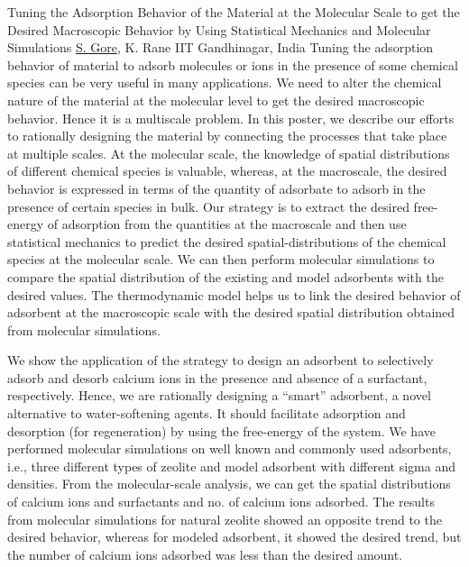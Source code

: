 
    \begin{abstract_online}{Tuning the Adsorption Behavior of the Material at the Molecular Scale to get the Desired Macroscopic Behavior by Using Statistical Mechanics and Molecular Simulations}{%
        \underline{S. Gore}, K. Rane}{%
        }{%
        IIT Gandhinagar, India}
    Tuning the adsorption behavior of material to adsorb molecules or ions in the presence of some chemical species can be very useful in many applications. We need to alter the chemical nature of the material at the molecular level to get the desired macroscopic behavior. Hence it is a multiscale problem. In this poster, we describe our efforts to rationally designing the material by connecting the processes that take place at multiple scales. At the molecular scale, the knowledge of spatial distributions of different chemical species is valuable, whereas, at the macroscale, the desired behavior is expressed in terms of the quantity of adsorbate to adsorb in the presence of certain species in bulk. Our strategy is to extract the desired free-energy of adsorption from the quantities at the macroscale and then use statistical mechanics to predict the desired spatial-distributions of the chemical species at the molecular scale. We can then perform molecular simulations to compare the spatial distribution of the existing and model adsorbents with the desired values. The thermodynamic model helps us to link the desired behavior of adsorbent at the macroscopic scale with the desired spatial distribution obtained from molecular simulations. \par We show the application of the strategy to design an adsorbent to selectively adsorb and desorb calcium ions in the presence and absence of a surfactant, respectively. Hence, we are rationally designing a “smart” adsorbent, a novel alternative to water-softening agents. It should facilitate adsorption and desorption (for regeneration) by using the free-energy of the system. We have performed molecular simulations on well known and commonly used adsorbents, i.e., three different types of zeolite and model adsorbent with different sigma and densities. From the molecular-scale analysis, we can get the spatial distributions of calcium ions and surfactants and no. of calcium ions adsorbed. The results from molecular simulations for natural zeolite showed an opposite trend to the desired behavior, whereas for modeled adsorbent, it showed the desired trend, but the number of calcium ions adsorbed was less than the desired amount. 
    
    \end{abstract_online}
    